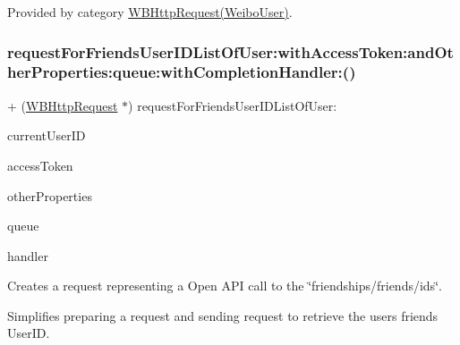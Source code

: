 Provided by category \mbox{\hyperlink{category_w_b_http_request_07_weibo_user_08_a388ba16ea6e89e121893833f2a7d7b86}{W\+B\+Http\+Request(\+Weibo\+User)}}.

\mbox{\label{interface_w_b_http_request_a388ba16ea6e89e121893833f2a7d7b86}} 
\subsubsection{\texorpdfstring{request\+For\+Friends\+User\+I\+D\+List\+Of\+User\+:with\+Access\+Token\+:and\+Other\+Properties\+:queue\+:with\+Completion\+Handler\+:()}{requestForFriendsUserIDListOfUser:withAccessToken:andOtherProperties:queue:withCompletionHandler:()}\hspace{0.1cm}{\footnotesize\ttfamily [2/3]}}
{\footnotesize\ttfamily + (\mbox{\hyperlink{interface_w_b_http_request}{W\+B\+Http\+Request}} $\ast$) request\+For\+Friends\+User\+I\+D\+List\+Of\+User\+: \begin{DoxyParamCaption}\item[{(N\+S\+String $\ast$)}]{current\+User\+ID }\item[{withAccessToken:(N\+S\+String $\ast$)}]{access\+Token }\item[{andOtherProperties:(N\+S\+Dictionary $\ast$)}]{other\+Properties }\item[{queue:(N\+S\+Operation\+Queue $\ast$)}]{queue }\item[{withCompletionHandler:(W\+B\+Request\+Handler)}]{handler }\end{DoxyParamCaption}}

Creates a request representing a Open A\+PI call to the \char`\"{}friendships/friends/ids\char`\"{}.

Simplifies preparing a request and sending request to retrieve the user\textquotesingle{}s friends\textquotesingle{} User\+ID.

